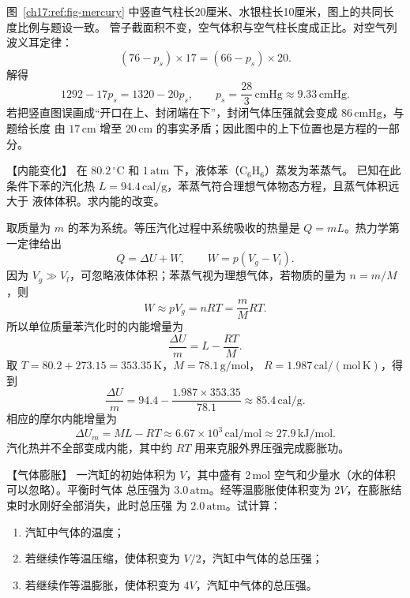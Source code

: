 {\begin{xesolution}
\par\noindent\begin{minipage}{\linewidth}
\mercuryTubeFigure
{}\label{ch17:ref:fig-mercury}
\end{minipage}\par\medskip

图~\ref{ch17:ref:fig-mercury} 中竖直气柱长20厘米、水银柱长10厘米，图上的共同长度比例与题设一致。
管子截面积不变，空气体积与空气柱长度成正比。对空气列波义耳定律：
\[
  (76-p_s)\times17=(66-p_s)\times20.
\]
解得
\[
  1292-17p_s=1320-20p_s,
  \qquad
  \boxed{p_s=\frac{28}{3}\,\mathrm{cmHg}\approx9.33\,\mathrm{cmHg}}.
\]
若把竖直图误画成“开口在上、封闭端在下”，封闭气体压强就会变成 $86\,\mathrm{cmHg}$，与题给长度
由 $17\,\mathrm{cm}$ 增至 $20\,\mathrm{cm}$ 的事实矛盾；因此图中的上下位置也是方程的一部分。
\end{xesolution}

\begin{origexamplebox}{【内能变化】}\label{ch17:ex:s31-22-2}
在 $80.2\,{}^{\circ}\mathrm C$ 和 $1\,\mathrm{atm}$ 下，液体苯（$\mathrm{C_6H_6}$）蒸发为苯蒸气。
已知在此条件下苯的汽化热 $L=94.4\,\mathrm{cal/g}$，苯蒸气符合理想气体物态方程，且蒸气体积远大于
液体体积。求内能的改变。

\ThQVaporization
\end{origexamplebox}

\begin{xesolution}
\ThAVaporization

取质量为 $m$ 的苯为系统。等压汽化过程中系统吸收的热量是 $Q=mL$。热力学第一定律给出
\[
  Q=\Delta U+W,
  \qquad W=p(V_g-V_l).
\]
因为 $V_g\gg V_l$，可忽略液体体积；苯蒸气视为理想气体，若物质的量为 $n=m/M$，则
\[
  W\approx pV_g=nRT=\frac{m}{M}RT.
\]
所以单位质量苯汽化时的内能增量为
\[
  \frac{\Delta U}{m}=L-\frac{RT}{M}.
\]
取 $T=80.2+273.15=353.35\,\mathrm K$，$M=78.1\,\mathrm{g/mol}$，
$R=1.987\,\mathrm{cal/(mol\,K)}$，得到
\[
  \boxed{\frac{\Delta U}{m}
  =94.4-\frac{1.987\times353.35}{78.1}
  \approx85.4\,\mathrm{cal/g}}.
\]
相应的摩尔内能增量为
\[
  \boxed{\Delta U_m=ML-RT
  \approx6.67\times10^3\,\mathrm{cal/mol}
  \approx27.9\,\mathrm{kJ/mol}}.
\]
汽化热并不全部变成内能，其中约 $RT$ 用来克服外界压强完成膨胀功。
\end{xesolution}

\begin{origexamplebox}{【气体膨胀】}\label{ch17:ex:s31-22-3}
一汽缸的初始体积为 $V$，其中盛有 $2\,\mathrm{mol}$ 空气和少量水（水的体积可以忽略）。平衡时气体
总压强为 $3.0\,\mathrm{atm}$。经等温膨胀使体积变为 $2V$，在膨胀结束时水刚好全部消失，此时总压强
为 $2.0\,\mathrm{atm}$。试计算：
\begin{enumerate}[label=\arabic*.]
  \item 汽缸中气体的温度；
  \item 若继续作等温压缩，使体积变为 $V/2$，汽缸中气体的总压强；
  \item 若继续作等温膨胀，使体积变为 $4V$，汽缸中气体的总压强。
\end{enumerate}


\end{origexamplebox}}
